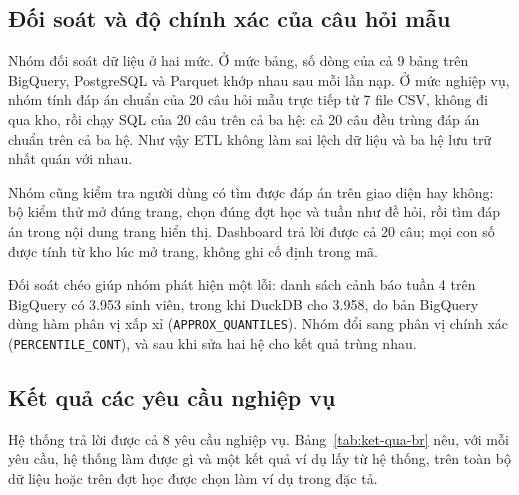 \subsection{Đối soát và độ chính xác của câu hỏi mẫu}
\label{sec:doi-soat}

Nhóm đối soát dữ liệu ở hai mức. Ở mức bảng, số dòng của cả 9 bảng trên BigQuery, PostgreSQL
và Parquet khớp nhau sau mỗi lần nạp. Ở mức nghiệp vụ, nhóm tính đáp án chuẩn của 20 câu hỏi
mẫu trực tiếp từ 7 file CSV, không đi qua kho, rồi chạy SQL của 20 câu trên cả ba hệ: cả 20 câu
đều trùng đáp án chuẩn trên cả ba hệ. Như vậy ETL không làm sai lệch dữ liệu và ba hệ lưu trữ
nhất quán với nhau.

Nhóm cũng kiểm tra người dùng có tìm được đáp án trên giao diện hay không: bộ kiểm thử mở đúng
trang, chọn đúng đợt học và tuần như đề hỏi, rồi tìm đáp án trong nội dung trang hiển thị.
Dashboard trả lời được cả 20 câu; mọi con số được tính từ kho lúc mở trang, không ghi cố định
trong mã.

Đối soát chéo giúp nhóm phát hiện một lỗi: danh sách cảnh báo tuần 4 trên BigQuery có 3.953 sinh
viên, trong khi DuckDB cho 3.958, do bản BigQuery dùng hàm phân vị xấp xỉ
(\texttt{APPROX\_QUANTILES}). Nhóm đổi sang phân vị chính xác (\texttt{PERCENTILE\_CONT}), và sau khi
sửa hai hệ cho kết quả trùng nhau.

\subsection{Kết quả các yêu cầu nghiệp vụ}
\label{sec:ket-qua-br}

Hệ thống trả lời được cả 8 yêu cầu nghiệp vụ. Bảng~\ref{tab:ket-qua-br} nêu, với mỗi yêu cầu,
hệ thống làm được gì và một kết quả ví dụ lấy từ hệ thống, trên toàn bộ dữ liệu hoặc trên đợt học
được chọn làm ví dụ trong đặc tả.

